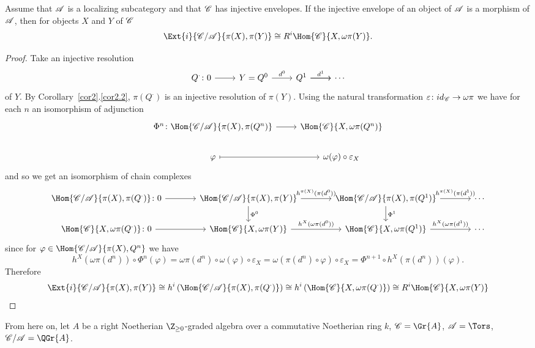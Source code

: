 \documentclass[10pt]{amsart}
\begin{document}
\begin{cor}\label{cor3}
  Assume that $\mathscr{A}$ is a localizing subcategory and that $\mathscr{C}$ has injective envelopes.
  If the injective envelope of an object of $\mathscr{A}$ is a morphism of $\mathscr{A}$, then for objects $X$ and $Y$ of $\mathscr{C}$
  $$\Ext{i}{\C/\A}{\pi(X), \pi(Y)} \cong R^i \Hom{\C}{X, \omega\pi(Y)}.$$
  
  \begin{proof}
    Take an injective resolution
    $$\begin{tikzcd}
      Q^\cdot \colon 0 \arrow{r} & Y = Q^0 \arrow{r}{d^0} & Q^1 \arrow{r}{d^1} \arrow{r} & \cdots 
    \end{tikzcd}$$
    of $Y$.
    By Corollary~\ref{cor2}.\ref{cor2.2}, $\pi(Q^\cdot)$ is an injective resolution of $\pi(Y)$.
    Using the natural transformation $\varepsilon \colon id_{\mathscr{C}} \rightarrow \omega\pi$ we have for each $n$ an isomorphism of adjunction
    $$\begin{tikzcd}
      \Phi^n \colon \Hom{\C/\A}{\pi(X), \pi(Q^n)} \arrow{r} & \Hom{\C}{X, \omega\pi(Q^n)}\\
      \varphi \arrow[mapsto]{r} & \omega(\varphi) \circ \varepsilon_X
    \end{tikzcd}$$
    and so we get an isomorphism of chain complexes
    $$\begin{tikzcd}[column sep=large]
      \Hom{\C/\A}{\pi(X), \pi(Q^\cdot)} \colon 0 \arrow{r} & \Hom{\C/\A}{\pi(X),\pi(Y)} \arrow{d}{\Phi^0}\arrow{r}{h^{\pi(X)}(\pi(d^0))} & \Hom{\C/\A}{\pi(X), \pi(Q^1)}\arrow{d}{\Phi^1} \arrow{r}{h^{\pi(X)}(\pi(d^1))} & \cdots\\
      \Hom{\C}{X, \omega\pi(Q^\cdot)} \colon 0 \arrow{r} & \Hom{\C}{X,\omega\pi(Y)} \arrow{r}{h^X(\omega\pi(d^0))} & \Hom{\C}{X, \omega\pi(Q^1)} \arrow{r}{h^X(\omega\pi(d^1))} & \cdots
    \end{tikzcd}$$
    since for $\varphi \in \Hom{\C/\A}{\pi(X), Q^n}$ we have
    $$h^X(\omega\pi(d^n)) \circ \Phi^n(\varphi) = \omega\pi(d^n) \circ \omega(\varphi) \circ \varepsilon_X = \omega(\pi(d^n) \circ \varphi) \circ \varepsilon_X = \Phi^{n+1} \circ h^X(\pi(d^n))(\varphi).$$
    Therefore 
    $$\Ext{i}{\C/\A}{\pi(X), \pi(Y)} \cong h^i\left(\Hom{\C/\A}{\pi(X), \pi(Q^\cdot)}\right) \cong h^i\left(\Hom{\C}{X, \omega\pi(Q^\cdot)}\right) \cong R^i \Hom{\C}{X, \omega\pi(Y)}$$
  \end{proof}
\end{cor}

From here on, let $A$ be a right Noetherian $\Z_{\geq 0}$-graded algebra over a commutative Noetherian ring $k$, $\C = \Gr{A}$, $\A = \Tors$, $\C/\A = \QGr{A}$.
\end{document}
